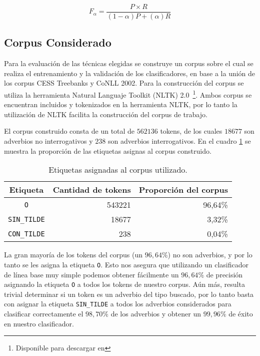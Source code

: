 \documentclass[runningheads,a4paper]{llncs}
\begin{document}
\begin{equation}
	\label{eq:medida-f}
	F_{\alpha} = \frac{P \times R}{(1 - \alpha)P + (\alpha)R}
\end{equation}

\subsection{Corpus Considerado}
Para la evaluación de las técnicas elegidas se construye un corpus sobre el cual se realiza el entrenamiento y la validación de los clasificadores,  en base a la unión de los corpus CESS Treebanks y CoNLL 2002. Para la construcción del corpus se utiliza la herramienta Natural Languaje Toolkit (NLTK) 2.0~\footnote{Disponible para descargar en \nltk}. Ambos corpus se encuentran incluidos y tokenizados en la herramienta NLTK, por lo tanto la utilización de NLTK facilita la construcción del corpus de trabajo.

El corpus construido consta de un total de $562136$ tokens, de los cuales $18677$ son adverbios no interrogativos y $238$ son adverbios interrogativos. En el cuadro \ref{table:corpus} se muestra la proporci\'on de las etiquetas asignas al corpus construido.

\begin{table}[ht]
 	\renewcommand{\arraystretch}{1.3}
	\renewcommand{\tabcolsep}{3pt}
	\caption{Etiquetas asignadas al corpus utilizado.}
	\label{table:corpus}
	\centering
	\begin{tabular}{c r r}
		\hline\hline
		\multicolumn{1}{c}{\textbf{Etiqueta}} & \multicolumn{1}{c}{\textbf{Cantidad de tokens}} & \multicolumn{1}{c}{\textbf{Proporci\'on del corpus}} \\
		\hline
		\texttt{O} & 543221 & 96,64\% \\
		\texttt{SIN\_TILDE} & 18677 & 3,32\% \\
		\texttt{CON\_TILDE} & 238 & 0,04\% \\
		\hline
	\end{tabular}
\end{table}

La gran mayoría de los tokens del corpus (un $96,64\%$)  no son adverbios, y por lo tanto se les asigna la etiqueta \texttt{\small O}. Esto nos asegura que utilizando un clasificador de línea base muy simple podemos obtener fácilmente un $96,64\%$ de precisión asignando la etiqueta \texttt{\small O} a todos los tokens de nuestro corpus. A\'un m\'as, resulta trivial determinar si un token es un adverbio del tipo buscado, por lo tanto basta con asignar la etiqueta \texttt{\small SIN\_TILDE} a todos los adverbios considerados para clasificar correctamente el $98,70\%$ de los adverbios y obtener un $99,96\%$ de \'exito en nuestro clasificador.
\end{document}

